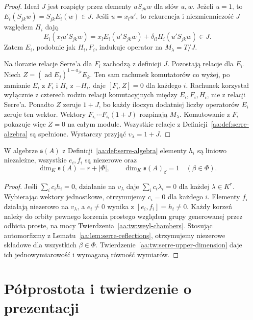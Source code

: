 \begin{proof}
Ideał $J$ jest rozpięty przez elementy $u S_{jk} w$ dla słów $u,w$. Jeżeli $u=1$, to
$E_i(S_{jk}w)=S_{jk}E_i(w)\in J$. Jeśli $u=x_lu'$, to rekurencja i niezmienniczość $J$ względem $H_i$ dają
\[
 E_i(x_lu'S_{jk}w)=x_l E_i(u'S_{jk}w)
                +\delta_{il}H_i(u'S_{jk}w)\in J.
\]
Zatem $E_i$, podobnie jak $H_i,F_i$, indukuje operator na $M_\lambda=T/J$.

Na ilorazie relacje Serre'a dla $F_i$ zachodzą z definicji $J$. Pozostają relacje dla $E_i$. Niech $Z=(\operatorname{ad}E_j)^{1-a_{jk}}E_k$. Ten sam rachunek komutatorów co wyżej, po zamianie $E_i$ z $F_i$ i $H_i$ z $-H_i$, daje $[F_i,Z]=0$ dla każdego $i$. Rachunek korzystał wyłącznie z czterech rodzin relacji komutacyjnych między $E_i,F_i,H_i$, nie z relacji Serre'a. Ponadto $Z$ zeruje $1+J$, bo każdy iloczyn dodatniej liczby operatorów $E_i$ zeruje ten wektor. Wektory $F_{i_1}\cdots F_{i_l}(1+J)$ rozpinają $M_\lambda$. Komutowanie z $F_i$ pokazuje więc $Z=0$ na całym module. Wszystkie relacje z Definicji~\ref{aa:def:serre-algebra} są spełnione. Wystarczy przyjąć $v_\lambda=1+J$.
\end{proof}

\begin{wniosek}
\label{aa:cor:serre-dimension}
W algebrze $\mathfrak s(A)$ z Definicji~\ref{aa:def:serre-algebra} elementy $h_i$ są liniowo niezależne, wszystkie $e_i,f_i$ są niezerowe oraz
\[
 \dim_K\mathfrak s(A)=r+|\Phi|,
 \qquad \dim_K\mathfrak s(A)_\beta=1\quad(\beta\in\Phi).
\]
\end{wniosek}
\begin{proof}
Jeśli $\sum_i c_i h_i=0$, działanie na $v_\lambda$ daje $\sum_i c_i\lambda_i=0$ dla każdej $\lambda\in K^r$. Wybierając wektory jednostkowe, otrzymujemy $c_i=0$ dla każdego $i$. Elementy $f_i$ działają niezerowo na $v_\lambda$, a $e_i\ne0$ wynika z $[e_i,f_i]=h_i\ne0$. Każdy korzeń należy do orbity pewnego korzenia prostego względem grupy generowanej przez odbicia proste, na mocy Twierdzenia~\ref{aa:tw:weyl-chambers}. Stosując automorfizmy z Lematu~\ref{aa:lem:serre-reflections}, otrzymujemy niezerowe składowe dla wszystkich $\beta\in\Phi$. Twierdzenie~\ref{aa:tw:serre-upper-dimension} daje ich jednowymiarowość i wymaganą równość wymiarów.
\end{proof}

\section{Półprostota i twierdzenie o prezentacji}


